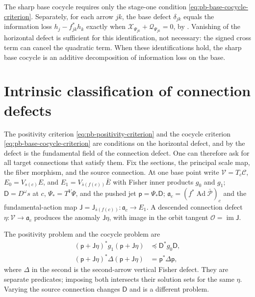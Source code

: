 The sharp base cocycle requires only the stage-one condition
\eqref{eq:pb-base-cocycle-criterion}. Separately, for each arrow \(jk\), the base defect
\(\delta_{jk}\) equals the information loss \(h_j-f_{jk}^*h_k\) exactly when
\(\mathcal X_{\Psi_{jk}}+\mathcal Q_{\Psi_{jk}}=0\), by
. Vanishing of the horizontal defect is sufficient for this
identification, not necessary: the signed cross term can cancel the quadratic term. When these
identifications hold, the sharp base cocycle is an additive decomposition of information loss on
the base.

\section{Intrinsic classification of connection defects}
\label{sec:pb-intrinsic-defect-classification}

The positivity criterion \eqref{eq:pb-positivity-criterion} and the cocycle criterion
\eqref{eq:pb-base-cocycle-criterion} are conditions on the horizontal defect, and by
 the defect is the fundamental field of the connection defect. One can
therefore ask for all target connections that satisfy them. Fix the sections, the principal scale map,
the fiber morphism, and the source connection. At one base point write \(\mathcal V=T_c\mathcal C\),
\(E_0=V_{s(c)}E\), and \(E_1=V_{\bar s(f(c))}\bar E\) with Fisher inner products \(g_0\) and \(g_1\);
\(\mathsf D=D^\omega s\) at \(c\), \(\Psi_*=T^V\Psi\), and the pushed jet \(\mathsf p=\Psi_*\mathsf D\);
\(\mathfrak a_c=(f^*\operatorname{Ad}\bar{\mathscr P})_c\) and the fundamental-action map
\(\mathsf J=\mathsf J_{\bar s(f(c))}:\mathfrak a_c\to E_1\). A descended connection defect
\(\eta:\mathcal V\to\mathfrak a_c\) produces the anomaly \(\mathsf J\eta\), with image in the orbit
tangent \(\mathcal O=\operatorname{im}\mathsf J\).

The positivity problem and the cocycle problem are
\begin{align}
(\mathsf p+\mathsf J\eta)^*g_1(\mathsf p+\mathsf J\eta)
&\preceq\mathsf D^*g_0\mathsf D,
\label{eq:pb-intrinsic-positivity-problem}\\
(\mathsf p+\mathsf J\eta)^*\Delta(\mathsf p+\mathsf J\eta)
&=\mathsf p^*\Delta\mathsf p,
\label{eq:pb-intrinsic-cocycle-problem}
\end{align}
where \(\Delta\) in the second is the second-arrow vertical Fisher defect. They are separate
predicates; imposing both intersects their solution sets for the same \(\eta\). Varying the source
connection changes \(\mathsf D\) and is a different problem.

